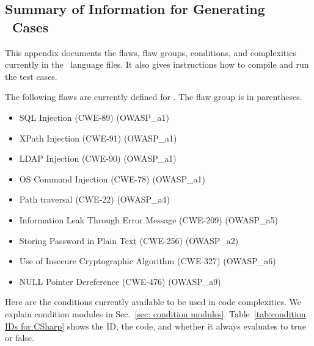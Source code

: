 \begin{appendices}

\section{Summary of Information for Generating \CSharp\ Cases}
\label{sec:CSharp language}

This appendix documents the flaws, flaw groups, conditions, and complexities
currently in the
\CSharp\ language files.
It also gives instructions how to compile and run the test cases.

The following flaws are currently defined for \CSharp.
The flaw group is in parentheses.
\begin{itemize}[nosep]
    \item SQL Injection (CWE-89)
        (OWASP\_a1)
    \item XPath Injection (CWE-91)
        (OWASP\_a1)
    \item LDAP Injection (CWE-90)
        (OWASP\_a1)
    \item OS Command Injection (CWE-78)
        (OWASP\_a1)
    \item Path traversal (CWE-22)
        (OWASP\_a4)
    \item Information Leak Through Error Message (CWE-209)
        (OWASP\_a5)
    \item Storing Password in Plain Text (CWE-256)
        (OWASP\_a2)
    \item Use of Insecure Cryptographic Algorithm (CWE-327)
        (OWASP\_a6)
    \item NULL Pointer Dereference (CWE-476)
        (OWASP\_a9)
\end{itemize}

Here are the conditions currently available to be used in code complexities.
We explain condition modules in Sec.~\ref{sec: condition modules}.
Table~\ref{tab:condition IDs for CSharp} shows the ID, the code, and whether it
always evaluates to true or false.


\end{appendices}

